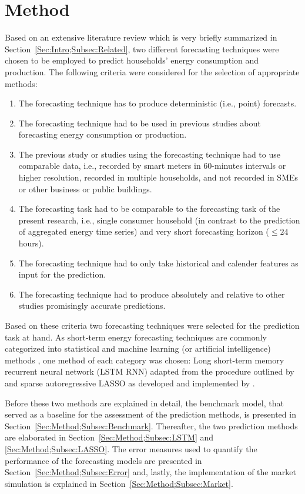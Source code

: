 
\section{Method}\label{Sec:Method}

Based on an extensive literature review which is very briefly summarized in Section~\ref{Sec:Intro;Subsec:Related}, two different forecasting techniques were chosen to be employed to predict households' energy consumption and production. The following criteria were considered for the selection of appropriate methods:

\begin{enumerate}
    \item The forecasting technique has to produce deterministic (i.e., point) forecasts.
    \item The forecasting technique had to be used in previous studies about forecasting energy consumption or production.
    \item The previous study or studies using the forecasting technique had to use comparable data, i.e., recorded by smart meters in 60-minutes intervals or higher resolution, recorded in multiple households, and not recorded in SMEs or other business or public buildings.
    \item The forecasting task had to be comparable to the forecasting task of the present research, i.e., single consumer household (in contrast to the prediction of aggregated energy time series) and very short forecasting horizon ($\leq 24$ hours).
    \item The forecasting technique had to only take historical and calender features as input for the prediction.
    \item The forecasting technique had to produce absolutely and relative to other studies promisingly accurate predictions.
\end{enumerate}

\noindent Based on these criteria two forecasting techniques were selected for the prediction task at hand. As short-term energy forecasting techniques are commonly categorized into statistical and machine learning (or artificial intelligence) methods \citep{Bansal:2015,Diagne:2013,Gan:2017}, one method of each category was chosen: Long short-term memory recurrent neural network (LSTM RNN) adapted from the procedure outlined by \citet{Shi:2017} and sparse autoregressive LASSO as developed and implemented by \citet{Li:2017}.

Before these two methods are explained in detail, the benchmark model, that served as a baseline for the assessment of the prediction methods, is presented in Section~\ref{Sec:Method;Subsec:Benchmark}. Thereafter, the two prediction methods are elaborated in Section~\ref{Sec:Method;Subsec:LSTM} and \ref{Sec:Method;Subsec:LASSO}. The error measures used to quantify the performance of the forecasting models are presented in Section~\ref{Sec:Method;Subsec:Error} and, lastly, the implementation of the market simulation is explained in Section~\ref{Sec:Method;Subsec:Market}.



